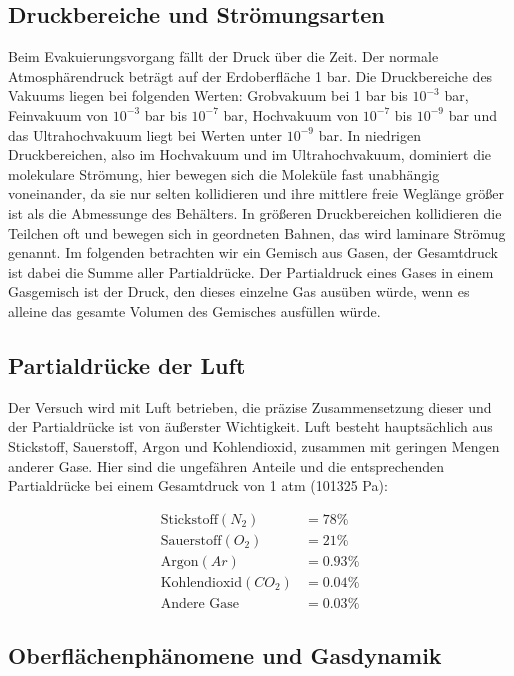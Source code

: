 \subsection{Druckbereiche und Strömungsarten}


Beim Evakuierungsvorgang fällt der Druck über die Zeit. Der normale Atmosphärendruck beträgt auf der Erdoberfläche 1 bar.
Die Druckbereiche des Vakuums liegen bei folgenden Werten:
Grobvakuum bei 1 bar bis $10^{-3}$ bar,  Feinvakuum von $10^{-3}$ bar bis $10^{-7}$ bar, Hochvakuum von $10^{-7}$ bis $10^{-9}$ bar und
das Ultrahochvakuum liegt bei Werten unter $10^{-9}$ bar.
In niedrigen Druckbereichen, also im Hochvakuum und im Ultrahochvakuum, dominiert die molekulare Strömung, hier bewegen sich die Moleküle fast unabhängig voneinander,
da sie nur selten kollidieren und ihre mittlere freie Weglänge größer ist als die Abmessunge des Behälters.
In größeren Druckbereichen kollidieren die Teilchen oft 
und bewegen sich in geordneten Bahnen, das wird laminare Strömug genannt.
Im folgenden betrachten wir ein Gemisch aus Gasen, der Gesamtdruck ist dabei die Summe aller Partialdrücke. Der Partialdruck eines Gases in
einem Gasgemisch ist der Druck, den dieses einzelne Gas ausüben würde, wenn es alleine das gesamte Volumen des Gemisches ausfüllen würde.

\subsection{Partialdrücke der Luft}
Der Versuch wird mit Luft betrieben, die präzise Zusammensetzung dieser und der Partialdrücke ist von äußerster Wichtigkeit.
Luft besteht hauptsächlich aus Stickstoff, Sauerstoff, Argon und Kohlendioxid, zusammen mit geringen Mengen anderer Gase. 
Hier sind die ungefähren Anteile und die entsprechenden Partialdrücke bei einem Gesamtdruck von 1 atm (101325 Pa):

\begin{align*}
\text{Stickstoff} (N_2) &= 78\% \\
\text{Sauerstoff} (O_2) &= 21\% \\
\text{Argon} (Ar) &= 0.93\% \\
\text{Kohlendioxid} (CO_2) &=0.04\% \\
\text{Andere Gase} &=0.03\% 
\end{align*}


\subsection{Oberflächenphänomene und Gasdynamik}


